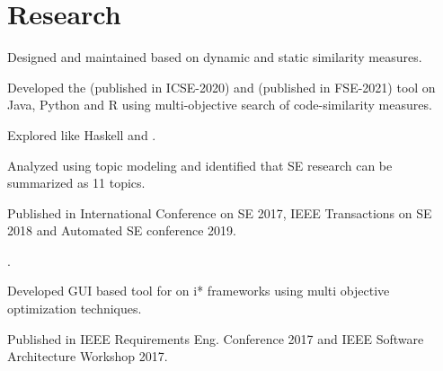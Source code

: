 \documentclass[]{bigfatnoob-resume}
\begin{document}
\hfill
\begin{minipage}[t]{0.65\textwidth} 


\section{Research}
\begin{tightemize}
    \vspace{\topsep}
    \item Designed and maintained  based on dynamic and static similarity measures.
    \item Developed the  (published in ICSE-2020) and  (published in FSE-2021) tool on Java, Python and R using multi-objective search of code-similarity measures.
    \item Explored  like Haskell and .
\end{tightemize}
\sectionsep

\begin{tightemize}
\item Analyzed  using topic modeling and identified that SE research can be summarized as 11 topics. 
\item Published in International Conference on SE 2017, IEEE Transactions on SE 2018 and Automated SE conference 2019.
\item {}.
\end{tightemize}
\sectionsep

\begin{tightemize}
\item Developed GUI based tool for  on i* frameworks using multi objective optimization techniques.
\item Published in IEEE Requirements Eng. Conference 2017 and IEEE Software Architecture Workshop 2017.
\end{tightemize}
\sectionsep


\end{minipage}
\end{document}
